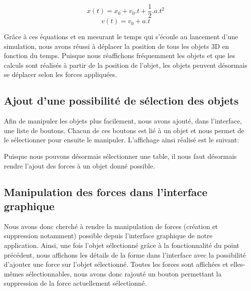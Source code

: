 \documentclass[11pt]{report}
\begin{document}
\[
      x(t) = x_{0} + v_{0} . t + \frac{1}{2}.a.t^{2}
\]
\[
      v(t) = v_{0} + a.t
\]

Grâce à ces équations et en mesurant le temps qui s'écoule au lancement d'une simulation, nous avons réussi à déplacer
la position de tous les objets 3D en fonction du temps. Puisque nous réaffichons fréquemment les objets et que les calculs sont réalisés
à partir de la position de l'objet, les objets peuvent désormais se déplacer selon les forces appliquées.\newline


\subsection{Ajout d'une possibilité de sélection des objets}

Afin de manipuler les objets plus facilement, nous avons ajouté, dans l'interface, une liste de boutons. Chacun de ces boutons est lié à un objet et nous permet de le sélectionner pour ensuite le manipuler. L'affichage ainsi réalisé est le suivant:


Puisque nous pouvons désormais sélectionner une table, il nous faut désormais rendre l'ajout des forces à un objet donné possible.


\subsection{Manipulation des forces dans l'interface graphique}

Nous avons donc cherché à rendre la manipulation de forces (création et suppression notamment) possible depuis l'interface graphique de notre application. Ainsi, une fois l'objet sélectionné grâce à la fonctionnalité du point précédent, nous affichons les détails de la forme dans l'interface avec la possibilité d'ajouter une force sur l'objet sélectionné. Toutes les forces sont affichées et elles-mêmes sélectionnables, nous avons donc rajouté un bouton permettant la suppression de la force actuellement sélectionné.

\end{document}
